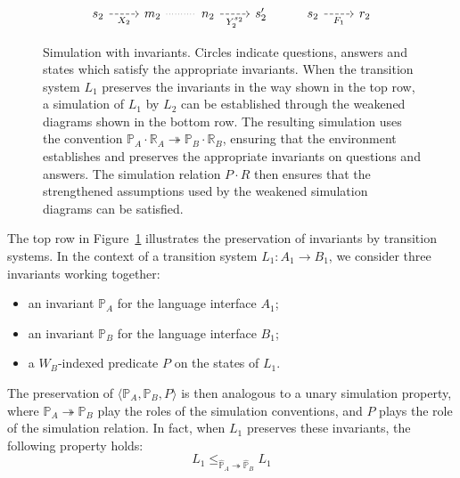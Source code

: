 \documentclass[11pt,oneside,draft]{book}
\theoremstyle{definition}
\begin{document}
\begin{figure}
\[\begin{tikzcd}
      |[alias=X12]| s_2 \ar[r, "X_2"', dashed] &
      |[alias=X22]| m_2 \ar[r, dotted, dash] &
      |[alias=Y12]| n_2 \ar[r, "Y_2^{s_2}"', dashed] &
      |[alias=Y22]| s_2' &
      |[alias=F12]| s_2 \ar[r, "F_1"', dashed] &
      |[alias=F22]| r_2
    \end{tikzcd}
  \]
  \caption[Simulation with invariants]%
   {Simulation with invariants.
    Circles indicate questions, answers and states
    which satisfy the appropriate invariants.
    When the transition system $L_1$ preserves the invariants
    in the way shown in the top row,
    a simulation of $L_1$ by $L_2$ can be established through
    the weakened diagrams shown in the bottom row.
    The resulting simulation uses the convention
    $\mathbb{P}_A \cdot \mathbb{R}_A \twoheadrightarrow
     \mathbb{P}_B \cdot \mathbb{R}_B$,
    ensuring that the environment
    establishes and preserves the appropriate invariants
    on questions and answers.
    The simulation relation $P \cdot R$ then ensures that
    the strengthened assumptions used by the
    weakened simulation diagrams can be satisfied.}
  \label{fig:fsim-inv}
\end{figure}

The top row in Figure~\ref{fig:fsim-inv}
illustrates the preservation of invariants by transition systems.
In the context of a transition system
$L_1 : A_1 \rightarrow B_1$,
we consider three invariants working together:
\begin{itemize}
  \item an invariant $\mathbb{P}_A$ for the language interface $A_1$;
  \item an invariant $\mathbb{P}_B$ for the language interface $B_1$;
  \item a $W_B$-indexed predicate $P$ on the states of $L_1$.
\end{itemize}
The preservation of
$\langle \mathbb{P}_A, \mathbb{P}_B, P \rangle$
is then analogous to a unary simulation property,
where $\mathbb{P}_A \twoheadrightarrow \mathbb{P}_B$
play the roles of the simulation conventions,
and $P$ plays the role of the simulation relation.
In fact,
when $L_1$ preserves these invariants,
the following property holds:
\[
    L_1 \le_{\hat{\mathbb{P}}_A \twoheadrightarrow \hat{\mathbb{P}}_B} L_1
\]
\end{document}
